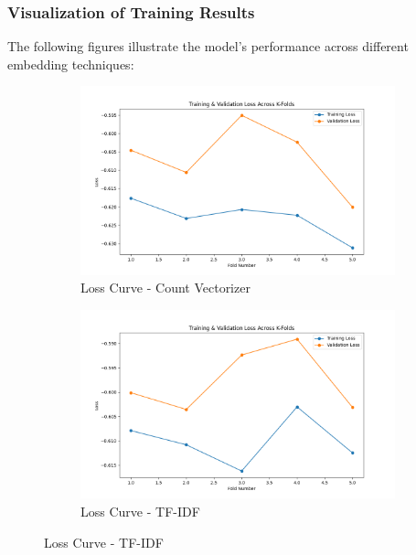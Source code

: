 \subsubsection{Visualization of Training Results}

The following figures illustrate the model’s performance across different embedding techniques:

\begin{figure}[H]
    \centering
    \begin{subfigure}[b]{0.48\textwidth}
        \includegraphics[width=\textwidth]{img/report_info/img/1.2.DecisionTree/best_decision_tree_count_loss.png}
        \caption{Loss Curve - Count Vectorizer}
        \label{fig:lr-count-loss}
    \end{subfigure}
    \begin{subfigure}[b]{0.48\textwidth}
        \includegraphics[width=\textwidth]{img/report_info/img/1.2.DecisionTree/best_decision_tree_tfidf_loss.png}
        \caption{Loss Curve - TF-IDF}
        \label{fig:lr-tfidf-loss}
    \end{subfigure}
    

\end{figure}
